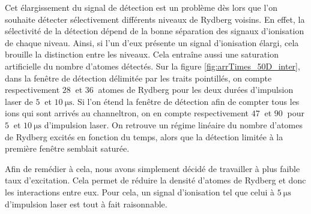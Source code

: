 %
Cet élargissement du signal de détection est un problème dès lors que l'on souhaite détecter sélectivement différents niveaux de Rydberg voisins.
En effet, la sélectivité de la détection dépend de la bonne séparation des signaux d'ionisation de chaque niveau.
Ainsi, si l'un d'eux présente un signal d'ionisation élargi, cela brouille la distinction entre les niveaux.
Cela entraîne aussi une saturation artificielle du nombre d'atomes détectés.
Sur la figure \eqref{fig:arrTimes_50D_inter}, dans la fenêtre de détection délimitée par les traits pointillés, on compte respectivement $\SI{28}{}$ et $\SI{36}{}$ atomes de Rydberg pour les deux durées d'impulsion laser de $\SI{5}{}$ et $\SI{10}{\us}$.
Si l'on étend la fenêtre de détection afin de compter tous les ions qui sont arrivés au channeltron, on en compte respectivement $\SI{47}{}$ et $\SI{90}{}$ pour $\SI{5}{}$ et $\SI{10}{\us}$ d'impulsion laser.
On retrouve un régime linéaire du nombre d'atomes de Rydberg excités en fonction du temps, alors que la détection limitée à la première fenêtre semblait saturée.

Afin de remédier à cela, nous avons simplement décidé de travailler à plus faible taux d'excitation.
Cela permet de réduire la densité d'atomes de Rydberg et donc les interactions entre eux.
Pour cela, un signal d'ionisation tel que celui à $\SI{5}{\us}$ d'impulsion laser est tout à fait raisonnable.

		
